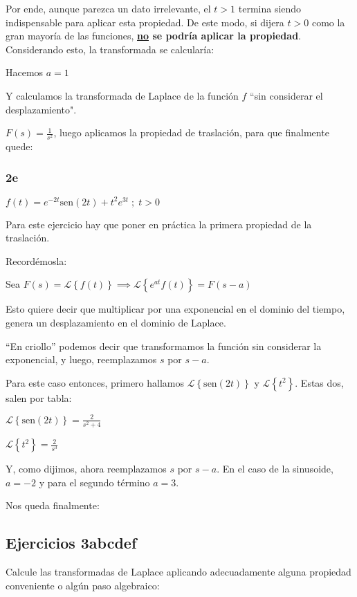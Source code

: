 \documentclass[11pt]{article}
\def\sen{\mathrm{sen}}
\newcommand{\lapl}[1]{\mathscr{L} \left\lbrace {#1} \right\rbrace}
\begin{document}
	Por ende, aunque parezca un dato irrelevante, el $t>1$ termina siendo indispensable para aplicar esta propiedad. De este modo, si dijera $t>0$ como la gran mayoría de las funciones, \textbf{\underline{no} se podría aplicar la propiedad}.
	Considerando esto, la transformada se calcularía:
	
	Hacemos $a=1$
	
	Y calculamos la transformada de Laplace de la función $f$ ``sin considerar el desplazamiento".
	
	$\displaystyle F(s)=\frac{1}{s^2}$, luego aplicamos la propiedad de traslación, para que finalmente quede:
	
	
	\subsubsection{2e}
	$f(t)=e^{-2t}\sen (2t)+t^{2}e^{3t} \;;\; t>0$
	
	Para este ejercicio hay que poner en práctica la primera propiedad de la traslación.
	
	Recordémosla:
	
	Sea $F(s)=\lapl{f(t)} \implies \lapl{e^{at}f(t)}=F(s-a)$
	
	Esto quiere decir que multiplicar por una exponencial en el dominio del tiempo, genera un desplazamiento en el dominio de Laplace.
	
    ``En criollo'' podemos decir que transformamos la función sin considerar la exponencial, y luego, reemplazamos $s$ por $s-a$.
    
    Para este caso entonces, primero hallamos $\lapl{\sen(2t)}$ y $\lapl{t^{2}}$. Estas dos, salen por tabla:
    
    $\displaystyle \lapl{\sen(2t)}=\frac{2}{s^{2}+4}$
    
    $\displaystyle \lapl{t^{2}}=\frac{2}{s^{3}}$
    
    Y, como dijimos, ahora reemplazamos $s$ por $s-a$. En el caso de la sinusoide, $a=-2$ y para el segundo término $a=3$.
    
    Nos queda finalmente:
    
    
    \subsection{Ejercicios 3abcdef}
    Calcule las transformadas de Laplace aplicando adecuadamente alguna propiedad conveniente o algún paso algebraico:
    
\end{document}
